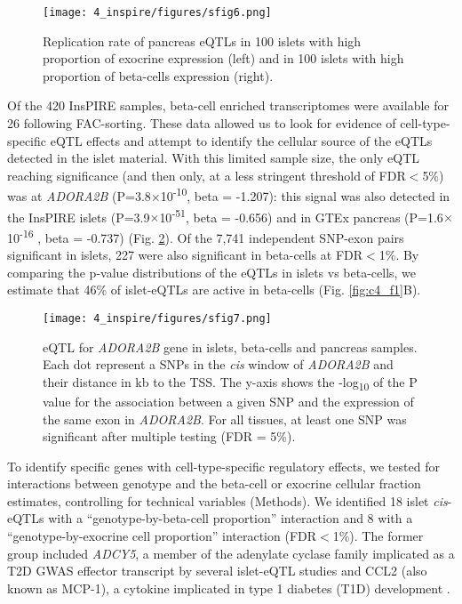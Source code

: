 \begin{figure}
    \centering
    \texttt{[image: 4\_inspire/figures/sfig6.png]}
    \caption[Replication rate of pancreas eQTLs in 100 islets]{Replication rate of pancreas eQTLs in 100 islets with high proportion of exocrine expression (left) and in 100 islets with high proportion of beta-cells expression (right).}
    \label{fig:c4_sf6}
  \end{figure}
  
Of the 420 InsPIRE samples, beta-cell enriched transcriptomes were available for 26 following FAC-sorting. These data allowed us to look for evidence of cell-type-specific eQTL effects and attempt to identify the cellular source of the eQTLs detected in the islet material. With this limited sample size, the only eQTL reaching significance (and then only, at a less stringent threshold of FDR$<$5\%) was at \textit{ADORA2B} (P=3.8$\times$10\textsuperscript{-10}, beta = -1.207): this signal was also detected in the InsPIRE islets (P=3.9$\times$10\textsuperscript{-51}, beta = -0.656) and in GTEx pancreas (P=1.6$\times$10\textsuperscript{-16} , beta = -0.737) (Fig. \ref{fig:c4_sf_adora2b}). Of the 7,741 independent SNP-exon pairs significant in islets, 227 were also significant in beta-cells at FDR$<$1\%. By comparing the p-value distributions of the eQTLs in islets vs beta-cells, we estimate that 46\% of islet-eQTLs are active in beta-cells (Fig. \ref{fig:c4_f1}B). 

\begin{figure}
    \centering
    \texttt{[image: 4\_inspire/figures/sfig7.png]}
    \caption[eQTL for \textit{ADORA2B} gene in islets, beta-cells and pancreas samples]{eQTL for \textit{ADORA2B} gene in islets, beta-cells and pancreas samples. Each dot represent a SNPs in the \textit{cis} window of \textit{ADORA2B} and their distance in kb to the TSS. The y-axis shows the -log\textsubscript{10} of the P value for the association between a given SNP and the expression of the same exon in \textit{ADORA2B}. For all tissues, at least one SNP was significant after multiple testing (FDR = 5\%). }
    \label{fig:c4_sf_adora2b}
 \end{figure}
  
To identify specific genes with cell-type-specific regulatory effects, we tested for interactions between genotype and the beta-cell or exocrine cellular fraction estimates, controlling for technical variables (Methods). We identified 18 islet \textit{cis}-eQTLs with a “genotype-by-beta-cell proportion” interaction and 8 with a “genotype-by-exocrine cell proportion” interaction (FDR$<$1\%). The former group included \textit{ADCY5}, a member of the adenylate cyclase family implicated as a T2D GWAS effector transcript by several islet-eQTL studies \cite{varshneyGeneticRegulatorySignatures2017, romanTypeDiabetesAssociated2017} and CCL2 (also known as MCP-1), a cytokine implicated in type 1 diabetes (T1D) development \cite{kriegelPancreaticIsletExpression2012}. 


